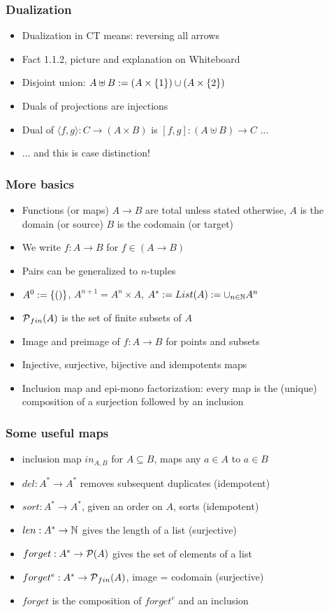 \documentclass[handout]{beamer}
\begin{document}
\frame
  {   
    \frametitle{Dualization}\label{Ch1:sets}

 \begin{itemize}[<+->]
\item Dualization in CT means: reversing all arrows
\item Fact 1.1.2, picture and explanation on Whiteboard
\item Disjoint union: $A\uplus B := (A\times\{1\})\cup(A\times\{2\})$
\item Duals of projections are injections
\item Dual of $\langle f,g\rangle : C \to (A\times B)$ is $[ f,g] : (A\uplus B) \to C$ ...
\item ... and this is case distinction!
 \end{itemize}

 }


\frame
  {   
     \frametitle{More basics}\label{Ch1:setbasics}

 \begin{itemize}[<+->]
\item Functions (or maps) $A\to B$ are total unless stated otherwise, 
$A$ is the domain (or source) $B$ is the codomain (or target)
\item We write $f: A\to B$ for $f\in (A\to B)$
\item Pairs can be generalized to $n$-tuples
\item $A^0 := \{()\}$, $A^{n+1}=A^n\times A$,
$A^* := List(A) := \cup_{n\in\mathbb{N}} A^n$
\item $\operatorname{\mathcal{P}}_{fin}(A)$ is the set of finite subsets of $A$
\item Image and preimage of $f: A\to B$ for points and subsets 
\item Injective, surjective, bijective and idempotents maps
\item Inclusion map and epi-mono factorization: every map
is the (unique) composition of a surjection followed by an inclusion
 \end{itemize}

 }

\frame
  {   
    \frametitle{Some useful maps}\label{Ch1:usefulmaps}

 \begin{itemize}[<+->]
\item inclusion map $in_{A,B}$ for $A\subseteq B$, maps any $a\in A$ to $a\in B$
\item $del: A^* \to A^* $ removes subsequent duplicates (idempotent)
\item $sort: A^* \to A^* $, given an order on $A$, sorts (idempotent)
\item $len: A^* \to \mathbb{N} $ gives the length of a list (surjective)
\item $forget: A^* \to \operatorname{\mathcal{P}}(A) $ gives the set of  elements of a list
\item $forget^e: A^* \to \operatorname{\mathcal{P}}_{fin}(A)$, image = codomain (surjective)
\item $forget$ is the composition of $forget^e$ and an inclusion
 \end{itemize}

 }
\end{document}
